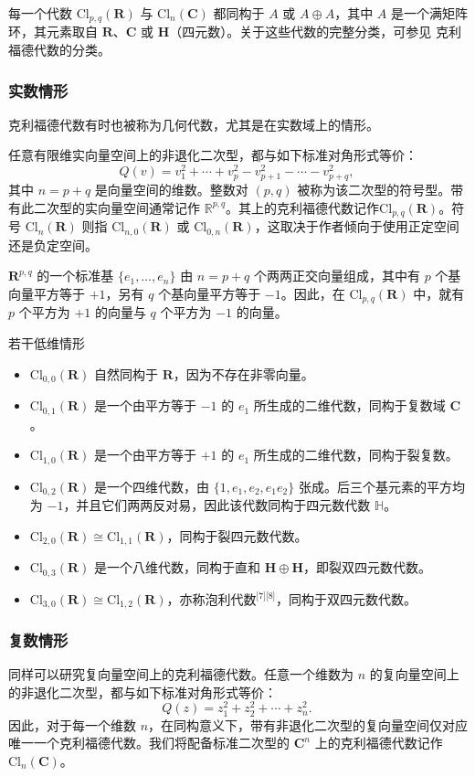 每一个代数 $\mathrm{Cl}_{p,q}(\mathbf{R})$ 与 $\mathrm{Cl}_{n}(\mathbf{C})$ 都同构于 $A$ 或 $A \oplus A$，其中 $A$ 是一个满矩阵环，其元素取自 $\mathbf{R}$、$\mathbf{C}$ 或 $\mathbf{H}$（四元数）。关于这些代数的完整分类，可参见 克利福德代数的分类。
\subsubsection{实数情形}
克利福德代数有时也被称为几何代数，尤其是在实数域上的情形。

任意有限维实向量空间上的非退化二次型，都与如下标准对角形式等价：
$$
Q(v) = v_1^2 + \cdots + v_p^2 - v_{p+1}^2 - \cdots - v_{p+q}^2,~
$$
其中 $n = p + q$ 是向量空间的维数。整数对 $(p, q)$ 被称为该二次型的符号型。带有此二次型的实向量空间通常记作 $\mathbb{R}^{p,q}$。其上的克利福德代数记作$\mathrm{Cl}_{p,q}(\mathbf{R})$。符号 $\mathrm{Cl}_n(\mathbf{R})$ 则指 $\mathrm{Cl}_{n,0}(\mathbf{R})$ 或 $\mathrm{Cl}_{0,n}(\mathbf{R})$，这取决于作者倾向于使用正定空间还是负定空间。

$\mathbf{R}^{p,q}$ 的一个标准基 $\{e_1, \ldots, e_n\}$ 由 $n = p+q$ 个两两正交向量组成，其中有 $p$ 个基向量平方等于 $+1$，另有 $q$ 个基向量平方等于 $-1$。因此，在 $\mathrm{Cl}_{p,q}(\mathbf{R})$ 中，就有 $p$ 个平方为 $+1$ 的向量与 $q$ 个平方为 $-1$ 的向量。

若干低维情形
\begin{itemize}
\item $\mathrm{Cl}_{0,0}(\mathbf{R})$ 自然同构于 $\mathbf{R}$，因为不存在非零向量。
\item $\mathrm{Cl}_{0,1}(\mathbf{R})$ 是一个由平方等于 $-1$ 的 $e_1$ 所生成的二维代数，同构于复数域 $\mathbf{C}$。
\item $\mathrm{Cl}_{1,0}(\mathbf{R})$ 是一个由平方等于 $+1$ 的 $e_1$ 所生成的二维代数，同构于裂复数。
\item $\mathrm{Cl}_{0,2}(\mathbf{R})$ 是一个四维代数，由 $\{1, e_1, e_2, e_1 e_2\}$ 张成。后三个基元素的平方均为 $-1$，并且它们两两反对易，因此该代数同构于四元数代数 $\mathbb{H}$。
\item $\mathrm{Cl}_{2,0}(\mathbf{R}) \cong \mathrm{Cl}_{1,1}(\mathbf{R})$，同构于裂四元数代数。
\item $\mathrm{Cl}_{0,3}(\mathbf{R})$ 是一个八维代数，同构于直和 $\mathbf{H} \oplus \mathbf{H}$，即裂双四元数代数。
\item $\mathrm{Cl}_{3,0}(\mathbf{R}) \cong \mathrm{Cl}_{1,2}(\mathbf{R})$，亦称泡利代数\(^\text{[7][8]}\)，同构于双四元数代数。
\end{itemize}
\subsubsection{复数情形}
同样可以研究复向量空间上的克利福德代数。任意一个维数为 $n$ 的复向量空间上的非退化二次型，都与如下标准对角形式等价：
$$
Q(z) = z_1^2 + z_2^2 + \cdots + z_n^2.~
$$
因此，对于每一个维数 $n$，在同构意义下，带有非退化二次型的复向量空间仅对应唯一一个克利福德代数。我们将配备标准二次型的 $\mathbf{C}^n$ 上的克利福德代数记作 $\mathrm{Cl}_n(\mathbf{C})$。

